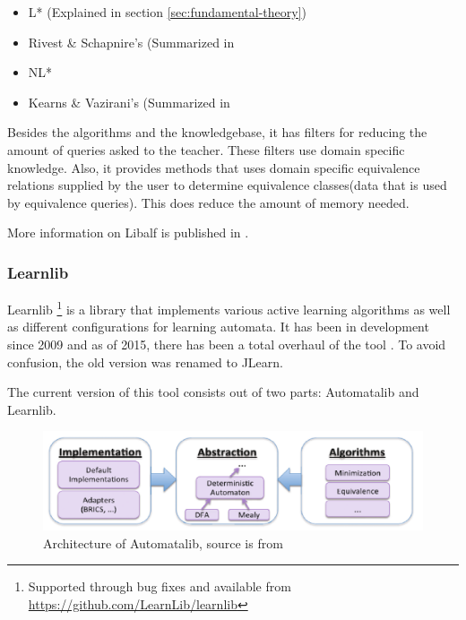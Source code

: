 \documentclass[multi,crop=false,class=article]{standalone}
\begin{document}
\begin{itemize}
	\item L* (Explained in section \ref{sec:fundamental-theory})
	\item Rivest \& Schapnire's (Summarized in 
	\item NL* \cite{Bollig2009}
	\item Kearns \& Vazirani's (Summarized in 
\end{itemize}

Besides the algorithms and the knowledgebase, it has filters for reducing the 
amount of queries asked to the teacher. These filters use domain specific 
knowledge. %
Also, it provides methods that uses domain specific equivalence relations 
supplied by the user to determine equivalence classes(data that is used by 
equivalence queries). This does reduce the amount of memory needed.

More information on Libalf is published in \cite{Bollig2010}.

\subsubsection{Learnlib}
\label{sssec:learnlib}

Learnlib  \footnote{Supported through bug fixes and available from 
\url{https://github.com/LearnLib/learnlib}} is a library that implements 
various active 
learning algorithms as well as different configurations for learning 
automata. It has been in development since 2009 \cite{Raffelt2009} and as of 
2015, there has been a total overhaul of the tool \cite{Isberner2015}. To avoid 
confusion, the old version was renamed to JLearn. 

The current version of this tool consists out of two parts: Automatalib and 
Learnlib.

\begin{figure}[!ht]
	\includegraphics[width=\textwidth]{Tool_images/automatalib_architecture.png}
	\caption{Architecture of Automatalib, source is from \cite{Isberner2015}}
	\label{fig:automatalib_arch}
\end{figure}
\end{document}
